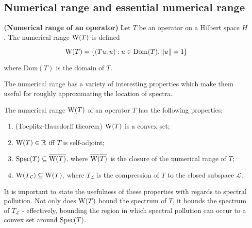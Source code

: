\documentclass[../main.tex]{subfiles}
\begin{document}
\subsection{Numerical range and essential numerical range}
\begin{definition}{\textbf{(Numerical range of an operator)}} Let $T$ be an operator on a Hilbert space $H$. The
numerical range $\mathrm{W}(T)$ is defined

$$\mathrm{W}(T) = \{( Tu, u ) : u \in \mathrm{Dom}(T), \|u\|=1\}$$

where $\text{Dom}(T)$ is the domain of $T$.
\end{definition}

The numerical range has a variety of interesting properties which make them useful for roughly approximating
the location of spectra.

\begin{proposition}\label{thm:num-range-props}
The numerical range $\mathrm{W}(T)$ of an operator $T$ has the following properties:
\begin{enumerate}
\item (Toeplitz-Hausdorff theorem)\label{item:toeplitz-hausdorff} $\mathrm{W}(T)$ is a convex set;
\item\label{item:num-in-R} $\mathrm{W}(T) \in \mathbb{R}$ iff $T$ is self-adjoint;
\item\label{item:spec-in-num} $\mathrm{Spec}(T) \subseteq \overline{\mathrm{W}(T)}$, where $\overline{\mathrm{W}(T)}$ is the closure of the numerical range of $T$;
\item\label{item:proj-num-range} $\mathrm{W}(T_\mathcal{L}) \subseteq \mathrm{W}(T)$, where $T_\mathcal{L}$ is the compression of $T$ to the closed subspace $\mathcal{L}$.
\end{enumerate}
\end{proposition}

It is important to state the usefulness of these properties with regards to spectral pollution. Not only does $\mathrm{W}(T)$ bound the spectrum of $T$,
it bounds the spectrum of $T_\mathcal{L}$ - effectively, bounding the region in which spectral pollution can occur to a convex set around $\mathrm{Spec}(T)$.
\end{document}
